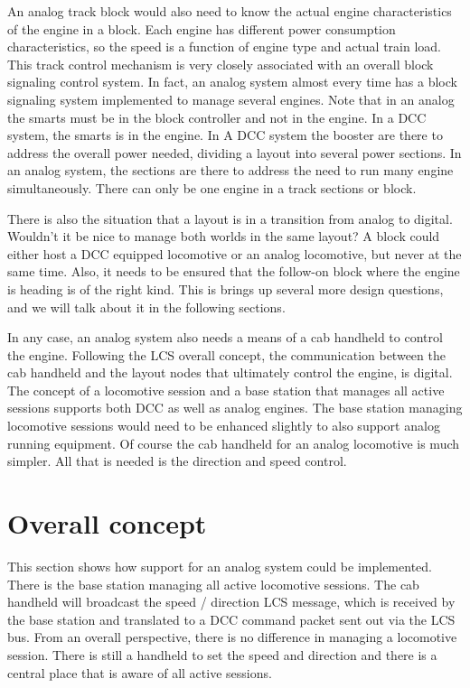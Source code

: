 An analog track block would also need to know the actual engine characteristics of the engine in a block. Each engine has different power consumption characteristics, so the speed is a function of engine type and actual train load. This track control mechanism is very closely associated with an overall block signaling control system. In fact, an analog system almost every time has a block signaling system implemented to manage several engines. Note that in an analog the smarts must be in the block controller and not in the engine. In a DCC system, the smarts is in the engine. In A DCC system the booster are there to address the overall power needed, dividing a layout into several power sections. In an analog system, the sections are there to address the need to run many engine simultaneously. There can only be one engine in a track sections or block.

There is also the situation that a layout is in a transition from analog to digital. Wouldn't it be nice to manage both worlds in the same layout? A block could either host a DCC equipped locomotive or an analog locomotive, but never at the same time. Also, it needs to be ensured that the follow-on block where the engine is heading is of the right kind. This is brings up several more design questions, and we will talk about it in the following sections.

In any case, an analog system also needs a means of a cab handheld to control the engine. Following the LCS overall concept, the communication between the cab handheld and the layout nodes that ultimately control the engine, is digital. The concept of a locomotive session and a base station that manages all active sessions supports both DCC as well as analog engines. The base station managing locomotive sessions would need to be enhanced slightly to also support analog running equipment. Of course the cab handheld for an analog locomotive is much simpler. All that is needed is the direction and speed control.

\section{Overall concept}

This section shows how support for an analog system could be implemented. There is the base station managing all active locomotive sessions. The cab handheld will broadcast the speed / direction LCS message, which is received by the base station and translated to a DCC command packet sent out via the LCS bus. From an overall perspective, there is no difference in managing a locomotive session. There is still a handheld to set the speed and direction and there is a central place that is aware of all active sessions.

